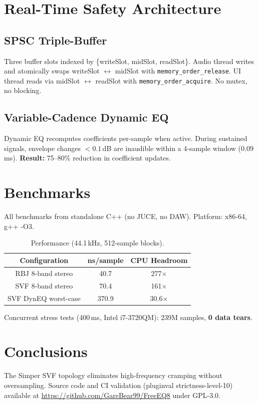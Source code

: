 \documentclass[11pt,a4paper]{article}
\begin{document}
\section{Real-Time Safety Architecture}

\subsection{SPSC Triple-Buffer}
Three buffer slots indexed by \{writeSlot, midSlot, readSlot\}. Audio thread writes and atomically swaps writeSlot $\leftrightarrow$ midSlot with \texttt{memory\_order\_release}. UI thread reads via midSlot $\leftrightarrow$ readSlot with \texttt{memory\_order\_acquire}. No mutex, no blocking.

\subsection{Variable-Cadence Dynamic EQ}
Dynamic EQ recomputes coefficients per-sample when active. During sustained signals, envelope changes $< 0.1$\,dB are inaudible within a 4-sample window (0.09\,ms). \textbf{Result:} 75--80\% reduction in coefficient updates.

\section{Benchmarks}
All benchmarks from standalone C++ (no JUCE, no DAW). Platform: x86-64, g++ -O3.

\begin{table}[ht]
  \caption{Performance (44.1\,kHz, 512-sample blocks).}
  \centering
  \begin{tabular}{ccc}\toprule
    Configuration & ns/sample & CPU Headroom \\\midrule
    RBJ 8-band stereo & 40.7 & 277$\times$ \\
    SVF 8-band stereo & 70.4 & 161$\times$ \\
    SVF DynEQ worst-case & 370.9 & 30.6$\times$ \\\bottomrule
  \end{tabular}
\end{table}

Concurrent stress tests (400\,ms, Intel i7-3720QM): 239M samples, \textbf{0 data tears}.

\section{Conclusions}
The Simper SVF topology eliminates high-frequency cramping without oversampling. Source code and CI validation (pluginval strictness-level-10) available at \url{https://github.com/GareBear99/FreeEQ8} under GPL-3.0.
\end{document}
